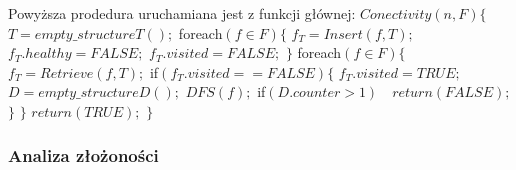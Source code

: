 \documentclass{pracamgr}
\begin{document}
     Powyższa prodedura uruchamiana jest z funkcji głównej:\newline\newline
     \hspace*{0pt}$Conectivity(n,F)\{$\newline
     \hspace*{16pt}	$T=empty\_structureT();$\newline
     \hspace*{16pt}	foreach$(f\in F)\{$\newline
     \hspace*{32pt}		$f_T=Insert(f,T);$\newline
     \hspace*{32pt}		$f_T.healthy=FALSE;$\newline
     \hspace*{32pt}		$f_T.visited=FALSE;$\newline
     \hspace*{16pt}	$\}$\newline
     \hspace*{16pt}	foreach$(f\in F)\{$\newline
     \hspace*{32pt}		$f_T=Retrieve(f,T);$\newline
     \hspace*{32pt}		if$(f_T.visited==FALSE)\{$\newline
     \hspace*{48pt}		$f_T.visited=TRUE;$\newline
     \hspace*{48pt}		$D=empty\_structureD();$\newline
     \hspace*{48pt}		$DFS(f);$\newline
     \hspace*{48pt}		if$(D.counter>1)\quad return(FALSE);$\newline
     \hspace*{32pt}		$\}$\newline
     \hspace*{16pt}	$\}$\newline
     \hspace*{16pt}	$return(TRUE);$\newline
     \hspace*{0pt}$\}$
    \subsubsection{Analiza złożoności}
    
\end{document}
